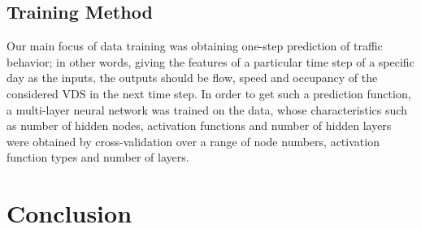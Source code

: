 \documentclass[11pt]{article}
\begin{document}
\subsection{Training Method}
Our main focus of data training was obtaining one-step prediction of traffic behavior; in other words, giving the features of a particular time step of a specific day as the inputs, the outputs should be flow, speed and occupancy of the considered VDS in the next time step. In order to get such a prediction function, a multi-layer neural network was trained on the data, whose characteristics such as number of hidden nodes, activation functions and number of hidden layers were obtained by cross-validation over a range of node numbers, activation function types and number of layers.
 

\section{Conclusion}



\end{document}
